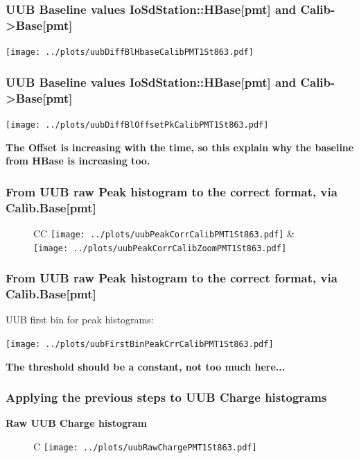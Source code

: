 \documentclass[aspectratio=169]{beamer}
\begin{document}
\begin{frame}
	\frametitle{UUB Baseline values IoSdStation::HBase[pmt] and Calib->Base[pmt]}
	\centering
	\texttt{[image: ../plots/uubDiffBlHbaseCalibPMT1St863.pdf]}
\end{frame}


\begin{frame}
	\frametitle{UUB Baseline values IoSdStation::HBase[pmt] and Calib->Base[pmt]}
	\centering
	\texttt{[image: ../plots/uubDiffBlOffsetPkCalibPMT1St863.pdf]}
	\vspace{0.2cm}

	{\bf The Offset is increasing with the time, so this explain why the baseline 
	from HBase is increasing too.}
\end{frame}


\begin{frame}
	\frametitle{From UUB raw Peak histogram to the correct format, via Calib.Base[pmt]}
	\begin{figure}
		\centering
		\begin{tabularx}{\textwidth}{CC}
			\texttt{[image: ../plots/uubPeakCorrCalibPMT1St863.pdf]}
			&
			\texttt{[image: ../plots/uubPeakCorrCalibZoomPMT1St863.pdf]}
			\\
		\end{tabularx}
	\end{figure}
\end{frame}


\begin{frame}
	\frametitle{From UUB raw Peak histogram to the correct format, via Calib.Base[pmt]}
	UUB first bin for peak histograms:

	\centering
	\texttt{[image: ../plots/uubFirstBinPeakCrrCalibPMT1St863.pdf]}
	\vspace{0.2cm}

	{\bf The threshold should be a constant, not too much here...}

\end{frame}














\begin{frame}
	\frametitle{Applying the previous steps to UUB Charge histograms}
	{\bf Raw UUB Charge histogram}
	\begin{figure}
		\begin{tabularx}{\textwidth}{C}
			\texttt{[image: ../plots/uubRawChargePMT1St863.pdf]}
		\end{tabularx}
	\end{figure}
\end{frame}
\end{document}
